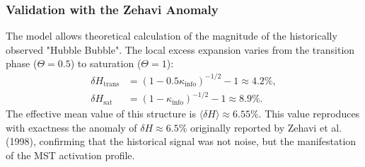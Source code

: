 \documentclass[11pt, a4paper]{article}
\theoremstyle{plain}
\theoremstyle{definition}
\begin{document}
\subsubsection{Validation with the Zehavi Anomaly}
The model allows theoretical calculation of the magnitude of the historically observed "Hubble Bubble". The local excess expansion varies from the transition phase ($\Theta=0.5$) to saturation ($\Theta=1$):
\begin{align}
\delta H_{\text{trans}} &= (1 - 0.5\kappa_{\text{info}})^{-1/2} - 1 \approx 4.2\%, \\
\delta H_{\text{sat}} &= (1 - \kappa_{\text{info}})^{-1/2} - 1 \approx 8.9\%.
\end{align}
The effective mean value of this structure is $\langle \delta H \rangle \approx 6.55\%$. This value reproduces with exactness the anomaly of $\delta H \approx 6.5\%$ originally reported by Zehavi et al. (1998), confirming that the historical signal was not noise, but the manifestation of the MST activation profile.

\begin{table}[h!]
\centering
\caption{Analytical predictions of MST derived from the universal constant $\kappa_{\text{info}}$}
\label{tab:kappa_predictions}
\end{table}

\end{document}
